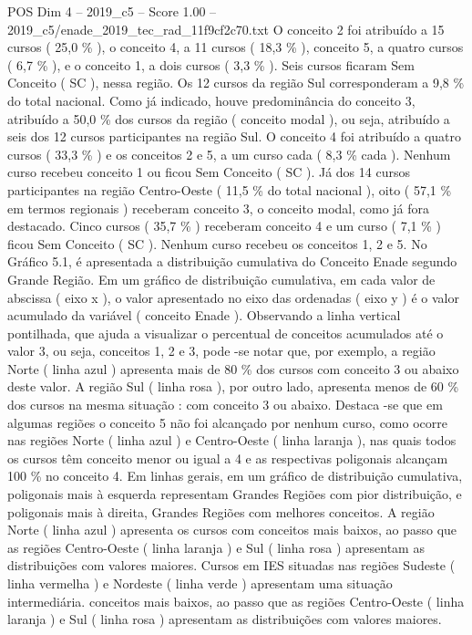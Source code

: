 \begin{textsample}{POS Dim 4 – 2019\_c5 – Score 1.00 – 2019\_c5/enade\_2019\_tec\_rad\_11f9cf2c70.txt}
O conceito 2 foi atribuído a 15 cursos ( 25,0 \% ), o conceito 4, a 11 cursos ( 18,3 \% ), conceito 5, a quatro cursos ( 6,7 \% ), e o conceito 1, a dois cursos ( 3,3 \% ).
Seis cursos ficaram Sem Conceito ( SC ), nessa região.
Os 12 cursos da região Sul corresponderam a 9,8 \% do total nacional.
Como já indicado, houve predominância do conceito 3, atribuído a 50,0 \% dos cursos da região ( conceito modal ), ou seja, atribuído a seis dos 12 cursos participantes na região Sul.
O conceito 4 foi atribuído a quatro cursos ( 33,3 \% ) e os conceitos 2 e 5, a um curso cada ( 8,3 \% cada ).
Nenhum curso recebeu conceito 1 ou ficou Sem Conceito ( SC ).
Já dos 14 cursos participantes na região Centro-Oeste ( 11,5 \% do total nacional ), oito ( 57,1 \% em termos regionais ) receberam conceito 3, o conceito modal, como já fora destacado.
Cinco cursos ( 35,7 \% ) receberam conceito 4 e um curso ( 7,1 \% ) ficou Sem Conceito ( SC ).
Nenhum curso recebeu os conceitos 1, 2 e 5.
No Gráfico 5.1, é apresentada a distribuição cumulativa do Conceito Enade segundo Grande Região.
Em um gráfico de distribuição cumulativa, em cada valor de abscissa ( eixo x ), o valor apresentado no eixo das ordenadas ( eixo y ) é o valor acumulado da variável ( conceito Enade ).
Observando a linha vertical pontilhada, que ajuda a visualizar o percentual de conceitos acumulados até o valor 3, ou seja, conceitos 1, 2 e 3, pode -se notar que, por exemplo, a região Norte ( linha azul ) apresenta mais de 80 \% dos cursos com conceito 3 ou abaixo deste valor.
A região Sul ( linha rosa ), por outro lado, apresenta menos de 60 \% dos cursos na mesma situação : com conceito 3 ou abaixo.
Destaca -se que em algumas regiões o conceito 5 não foi alcançado por nenhum curso, como ocorre nas regiões Norte ( linha azul ) e Centro-Oeste ( linha laranja ), nas quais todos os cursos têm conceito menor ou igual a 4 e as respectivas poligonais alcançam 100 \% no conceito 4.
Em linhas gerais, em um gráfico de distribuição cumulativa, poligonais mais à esquerda representam Grandes Regiões com pior distribuição, e poligonais mais à direita, Grandes Regiões com melhores conceitos.
A região Norte ( linha azul ) apresenta os cursos com conceitos mais baixos, ao passo que as regiões Centro-Oeste ( linha laranja ) e Sul ( linha rosa ) apresentam as distribuições com valores maiores.
Cursos em IES situadas nas regiões Sudeste ( linha vermelha ) e Nordeste ( linha verde ) apresentam uma situação intermediária. conceitos mais baixos, ao passo que as regiões Centro-Oeste ( linha laranja ) e Sul ( linha rosa ) apresentam as distribuições com valores maiores.

\end{textsample}
